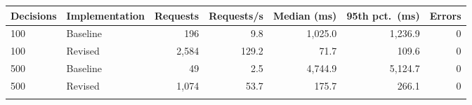 \begin{tabular}{@{}llrrrrr@{}}
\toprule
Decisions & Implementation & Requests & Requests/s & Median (ms) & 95th pct.\ (ms) & Errors\\
\midrule
100 & Baseline & 196 & 9.8 & 1,025.0 & 1,236.9 & 0\\
100 & Revised & 2,584 & 129.2 & 71.7 & 109.6 & 0\\
500 & Baseline & 49 & 2.5 & 4,744.9 & 5,124.7 & 0\\
500 & Revised & 1,074 & 53.7 & 175.7 & 266.1 & 0\\
\botrule
\end{tabular}
